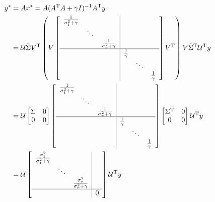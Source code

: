 \begin{align*}
y^* &= Ax^* = A(A^{\trans}A + \gamma I)^{-1}A^{\trans}y\\
&= \mathcal{U}\tilde{\Sigma}V^{\trans}\left(V
\left[
\begin{array}{c|c}
\begin{matrix}
\frac{1}{\sigma_1^2+\gamma} & &\\
&\ddots&\\
&&\frac{1}{\sigma_r^2+\gamma}
\end{matrix}&  \\ \hline 
& \begin{matrix}
\frac{1}{\gamma} & &\\
&\ddots&\\
&&\frac{1}{\gamma}
\end{matrix}
\end{array}
\right]
V^{\trans}\right)V\tilde{\Sigma}^{\trans}\mathcal{U}^{\trans}y\\
&= \mathcal{U}
\begin{bmatrix}
\Sigma & 0\\
0 & 0
\end{bmatrix}
\left[
\begin{array}{c|c}
\begin{matrix}
\frac{1}{\sigma_1^2+\gamma} & &\\
&\ddots&\\
&&\frac{1}{\sigma_r^2+\gamma}
\end{matrix}&  \\ \hline 
& \begin{matrix}
\frac{1}{\gamma} & &\\
&\ddots&\\
&&\frac{1}{\gamma}
\end{matrix}
\end{array}
\right]
\begin{bmatrix}
\Sigma^{\trans} & 0\\
0 & 0
\end{bmatrix}
\mathcal{U}^{\trans}y\\
&= \mathcal{U}
\left[
\begin{array}{c|c}
\begin{matrix}
\frac{\sigma_1^2}{\sigma_1^2+\gamma} & &\\
&\ddots&\\
&&\frac{\sigma_r^2}{\sigma_r^2+\gamma}
\end{matrix}&  \\ \hline 
& 0
\end{array}
\right]
\mathcal{U}^{\trans}y

\end{align*}

